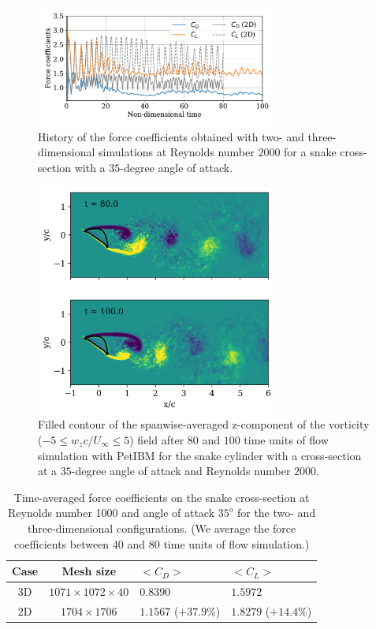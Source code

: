 \documentclass[10pt,journal,compsoc]{IEEEtran}
\begin{document}
\begin{figure}[!h]
    \centering
    \includegraphics[width=8cm]{figures/forceCoefficientsCompare2D.pdf}
    \caption{History of the force coefficients obtained with two- and three-dimensional simulations at Reynolds number $2000$ for a snake cross-section with a $35$-degree angle of attack.}
    \label{fig:force_coefficients}
\end{figure}

\begin{figure}[!h]
    \centering
    \includegraphics[width=8cm]{figures/wz_avg_multi_contourf.png}
    \caption{Filled contour of the spanwise-averaged z-component of the vorticity ($-5 \leq w_z c / U_\infty \leq 5$) field after $80$ and $100$ time units of flow simulation with PetIBM for the snake cylinder with a cross-section at a $35$-degree angle of attack and Reynolds number $2000$.}
    \label{fig:wz_avg_3d}
\end{figure}

\begin{table}[!h]
    \caption{Time-averaged force coefficients on the snake cross-section at Reynolds number 1000 and angle of attack $35^o$ for the two- and three-dimensional configurations. (We average the force coefficients between $40$ and $80$ time units of flow simulation.)}
    \label{tab:force_coefficients}
    \centering
    \begin{tabular}{ccll}
        \hline
        Case & Mesh size & $<C_D>$ & $<C_L>$ \\
        \hline
        3D & $1071 \times 1072 \times 40$ & $0.8390$ & $1.5972$ \\
        2D & $1704 \times 1706$ & $1.1567$ ($+37.9\%$) & $1.8279$ ($+14.4\%$) \\
        \hline
    \end{tabular}
\end{table}
\end{document}
